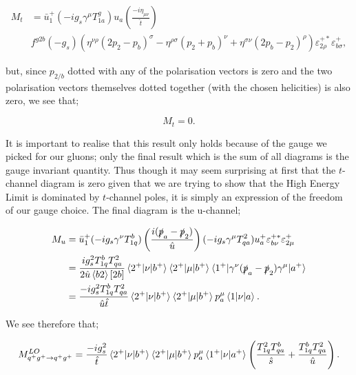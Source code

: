 \begin{equation}
\begin{split}
M_t & = \bar{u}_1^+ (- i g_s \gamma^\mu T^g_{1a}) u_a \left(\frac{-i \eta_{\mu \nu}}{\hat{t}} \right) \\
& f^{g2b}(-g_s)(\eta^{\nu \rho}(2 p_2 - p_b)^\sigma - \eta^{\rho \sigma}(p_2 + p_b)^\nu + \eta^{\sigma \nu}(2 p_b - p_2)^\rho) \varepsilon_{2 \rho}^{+*} \varepsilon_{b \sigma}^+,
\end{split}
\end{equation}

but, since $p_{2/b}$ dotted with any of the polarisation vectors is zero and the two polarisation vectors themselves dotted together (with the chosen helicities) is also zero, we see that;

\begin{equation}
M_t = 0.
\end{equation}

It is important to realise that this result only holds because of the gauge we picked for our gluons; only the final result which is the sum of all diagrams is the gauge invariant quantity. Thus though it may seem surprising at first that the $t$-channel diagram is zero given that we are trying to show that the High Energy Limit is dominated by $t$-channel poles, it is simply an expression of the freedom of our gauge choice. The final diagram is the u-channel;

\begin{equation}
\begin{split}
M_u &= \bar{u}^+_1 (- i g_s \gamma^\nu T^b_{1q}) \left( \frac{i(\slashed{p}_a - \slashed{p}_2)}{\hat{u}}\right)(- ig_s \gamma^\mu T^2_{qa}) u_a^+ \varepsilon_{b \nu}^{+*} \varepsilon_{2 \mu}^+ \\
&= \frac{i g_s^2 T^b_{1q}T^2_{qa}}{2 \hat{u} \left<b 2 \right> [2b]} \mathinner{\langle2^+\vert\nu\vert b^+\rangle}_{} \mathinner{\langle2^+\vert\mu\vert b^+\rangle}_{} \mathinner{\langle1^+\vert\gamma^\nu (\slashed{p}_a - \slashed{p}_2) \gamma^\mu\vert a^+\rangle}_{} \\
&= \frac{-i g_s^2 T^b_{1q}T^2_{qa}}{\hat{u} \hat{t}} \mathinner{\langle2^+\vert\nu\vert b^+\rangle}_{} \mathinner{\langle2^+\vert\mu\vert b^+\rangle}_{} p_a^\mu \mathinner{\langle1\vert\nu\vert a\rangle}_{}.
\end{split}
\end{equation}

We see therefore that;

\begin{equation}
M_{q^+g^+ \to q^+g^+}^{LO} = \frac{-i g_s^2}{\hat{t}}\mathinner{\langle2^+\vert\nu\vert b^+\rangle}_{} \mathinner{\langle2^+\vert\mu\vert b^+\rangle}_{}p_a^\mu \mathinner{\langle1^+\vert\nu\vert a^+\rangle}_{}\left(\frac{T^2_{1q}T^b_{qa}}{\hat{s}} + \frac{T^b_{1q}T^2_{qa}}{\hat{u}} \right).
\end{equation}

